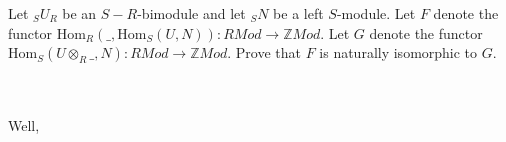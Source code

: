Let $_SU_R$ be an $S-R$-bimodule and let $_SN$ be a left $S$-module. Let $F$ denote the functor
$\text{Hom}_R(\_,\text{Hom}_S(U,N)):RMod\to \mathbb{Z}Mod$. Let $G$ denote the functor
$\text{Hom}_S(U\otimes_R\_,N):RMod\to \mathbb{Z}Mod$. Prove that $F$ is naturally isomorphic to $G$.\\\\

\begin{solution}\renewcommand{\qedsymbol}{}\ \\
    Well,
\end{solution}
